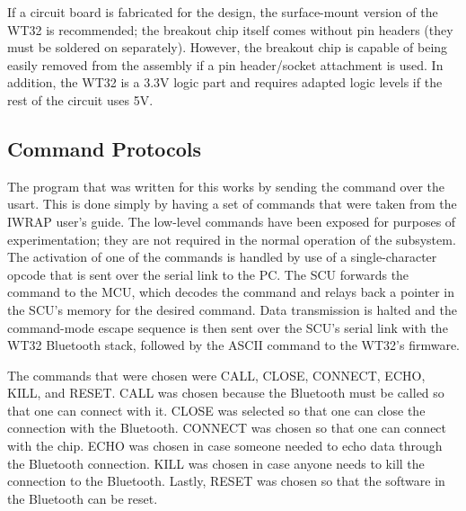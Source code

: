 If a circuit board is fabricated for the design, the surface-mount version of 
the WT32 is recommended; the breakout chip itself comes without pin headers 
(they must be soldered on separately). However, the breakout chip is capable of
 being easily removed from the assembly if a pin header/socket attachment is 
used. In addition, the WT32 is a 3.3V logic part and requires adapted logic 
levels if the rest of the circuit uses 5V. 

\subsection{Command Protocols}
The program that was written for this works by sending the command over the
 usart.  This is done simply by having a set of commands that were taken from 
the IWRAP user's guide. The low-level commands have been exposed for purposes
of experimentation; they are not required in the normal operation of the 
subsystem. The activation of one of the commands is handled by use of a
single-character opcode that is sent over the serial link to the PC. The SCU
forwards the command to the MCU, which decodes the command and relays back a
pointer in the SCU's memory for the desired command. Data transmission is 
halted and the command-mode escape sequence is then sent over the SCU's serial
link with the WT32 Bluetooth stack, followed by the ASCII command to the WT32's firmware. 
 
  The commands that were chosen were CALL, CLOSE, CONNECT, ECHO, KILL, and
 RESET.  CALL was chosen because the Bluetooth must be called so that one can
 connect with it.  CLOSE was selected so that one can close the connection 
with the Bluetooth.  CONNECT was chosen so that one can connect with the chip.
  ECHO was chosen in case someone needed to echo data through the Bluetooth
 connection.  KILL was chosen in case anyone needs to kill the connection to
 the Bluetooth.  Lastly, RESET was chosen so that the software in the Bluetooth
 can be reset. 
